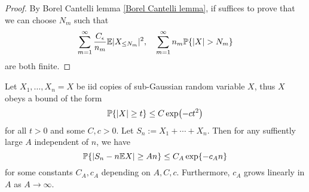 \begin{proof}
    By Borel Cantelli lemma \ref{Borel Cantelli lemma}, if suffices to prove that we can choose $N_m$ such that 
    \begin{equation*}
        \sum_{m=1}^\infty \frac{C_\epsilon}{n_m} \E |X_{\leq N_m}|^2,\quad \sum_{m=1}^\infty n_m \Pb\{|X|>N_m\}
    \end{equation*}
    are both finite. 
\end{proof}


\begin{proposition}
    Let $X_1,\dots,X_n = X$ be iid copies of sub-Gaussian random variable $X$, thus $X$ obeys a bound of the form 
    \begin{equation}
        \mathbb{P}\{|X|\geq t\} \leq C\exp (-ct^2)
    \end{equation}
    for all $t>0$ and some $C,c >0$. Let $S_n := X_1+\cdots+X_n.$ Then for any suffiently large $A$ independent of $n$, we have 
    \begin{equation*}
        \mathbb{P} \{|S_n-n\mathbb{E} X|\geq An\} \leq C_A \exp \{-c_A n\}
    \end{equation*}
    for some constants $C_A,c_A$ depending on $A,C,c$. Furthermore, $c_A$ grows linearly in $A$ as $A\to \infty$.
\end{proposition}

